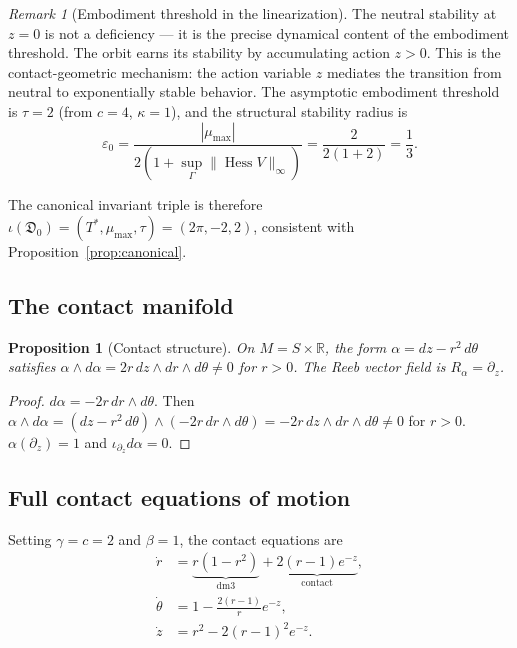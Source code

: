 \documentclass[12pt, oneside]{book}
\theoremstyle{plain}
\newtheorem{proposition}[theorem]{Proposition}
\theoremstyle{definition}
\theoremstyle{remark}
\newtheorem{remark}{Remark}[section]
\newcommand{\R}{\mathbb{R}}
\newcommand{\dm}{\mathfrak{D}}
\newcommand{\Orb}{\Gamma}
\DeclareMathOperator{\Hess}{Hess}
\begin{document}
\begin{remark}[Embodiment threshold in the linearization]
The neutral stability at $z=0$ is not a deficiency --- it is
the precise dynamical content of the embodiment threshold.
The orbit earns its stability by accumulating action $z>0$.
This is the contact-geometric mechanism: the action variable $z$
mediates the transition from neutral to exponentially stable
behavior. The asymptotic embodiment threshold is
$\tau=2$ (from $c=4$, $\kappa=1$), and the structural stability
radius is
\[
  \varepsilon_0
  = \frac{|\mu_{\max}|}{2(1+\sup_\Orb\|\Hess V\|_\infty)}
  = \frac{2}{2(1+2)}
  = \frac{1}{3}.
\]
\end{remark}

The canonical invariant triple is therefore
$\iota(\dm_0)=(T^*,\mu_{\max},\tau)=(2\pi,-2,2)$,
consistent with Proposition~\ref{prop:canonical}.

\subsection{The contact manifold}

\begin{proposition}[Contact structure]\label{prop:contactstruct}
On $M=S\times\R$, the form $\alpha=dz-r^2\,d\theta$ satisfies
$\alpha\wedge d\alpha=2r\,dz\wedge dr\wedge d\theta\ne 0$
for $r>0$. The Reeb vector field is $R_\alpha=\partial_z$.
\end{proposition}
\begin{proof}
$d\alpha=-2r\,dr\wedge d\theta$. Then
$\alpha\wedge d\alpha=(dz-r^2\,d\theta)\wedge(-2r\,dr\wedge d\theta)
=-2r\,dz\wedge dr\wedge d\theta\ne 0$ for $r>0$.
$\alpha(\partial_z)=1$ and $\iota_{\partial_z}d\alpha=0$.
\end{proof}

\subsection{Full contact equations of motion}

Setting $\gamma=c=2$ and $\beta=1$, the contact equations are
\begin{align}
  \dot r &= \underbrace{r(1-r^2)}_{\text{dm3}}
           + \underbrace{2(r-1)e^{-z}}_{\text{contact}},
           \label{eq:r-full}\\
  \dot\theta &= 1 - \frac{2(r-1)}{r}e^{-z},\label{eq:theta-full}\\
  \dot z &= r^2 - 2(r-1)^2 e^{-z}.\label{eq:z-full}
\end{align}
\end{document}
